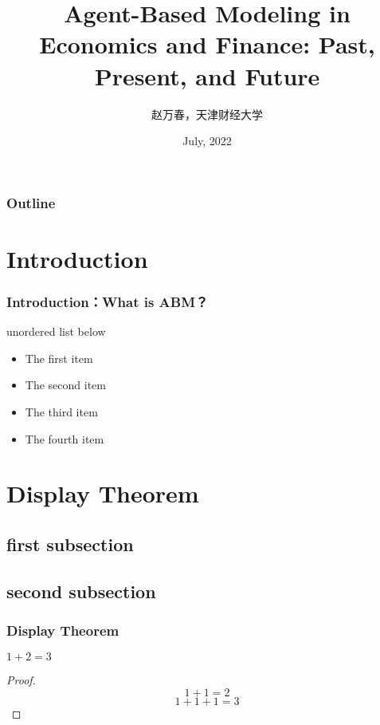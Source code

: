 \documentclass[aspectratio=169]{beamer}
\author{赵万春，天津财经大学}
\title{Agent-Based Modeling in Economics and Finance: 
	Past, Present, and Future}
\date{July, 2022}
\begin{document}
	
	\frame[plain]{\titlepage}
	
	\begin{frame}
		\frametitle{Outline}
		\tableofcontents
	\end{frame}
	
	\section{Introduction}
	
	\frame{\frametitle{Outline}\tableofcontents[currentsection]}
	
	\begin{frame}
		\frametitle{Introduction：What is ABM？}
		
		
		
		\vspace{0.4cm}
		
		
		
		
		unordered list below
		
		\begin{itemize}
			\item The first item
			\item The second item
			\item The third item
			\item The fourth item
		\end{itemize}
		
	\end{frame}
	
	\section{Display Theorem}
	
	
	\subsection{first subsection}
	
	\subsection{second subsection}
	
	
	
	\begin{frame}
		\frametitle{Display Theorem}
		\begin{theorem}
			$1 + 2 = 3$
		\end{theorem}
		\begin{proof}
			$$1 + 1 = 2$$
			$$1 + 1 + 1 = 3$$
		\end{proof}
	\end{frame}
	
\end{document}
